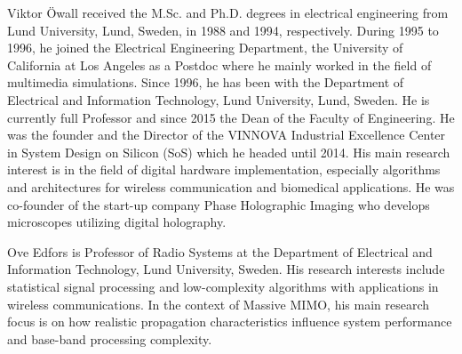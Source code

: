 \documentclass[journal]{IEEEtran}
\begin{document}
\begin{IEEEbiography}{Viktor \"{O}wall}
	received the M.Sc. and Ph.D. degrees in electrical engineering from Lund University, Lund, Sweden, in 1988 and 1994, respectively. 
	During 1995 to 1996, he joined the Electrical Engineering Department, the University of California at Los Angeles as a Postdoc where he mainly worked in the field of multimedia simulations. 
	Since 1996, he has been with the Department of Electrical and Information Technology, Lund University, Lund, Sweden. 
	He is currently full Professor and since 2015 the Dean of the Faculty of Engineering. 
	He was the founder and the Director of the VINNOVA Industrial Excellence Center in System Design on Silicon (SoS) which he headed until 2014. 
	His main research interest is in the field of digital hardware implementation, especially algorithms and architectures for wireless communication and biomedical applications. 
	He was co-founder of the start-up company Phase Holographic Imaging who develops microscopes utilizing digital holography.
\end{IEEEbiography}
%
\begin{IEEEbiography}{Ove Edfors}
	is Professor of Radio Systems at the Department of Electrical and Information Technology, Lund University, Sweden.
	His research interests include statistical signal processing and low-complexity algorithms with applications in wireless communications. 
	In the context of Massive MIMO, his main research focus is on how realistic propagation characteristics 
	influence system performance and base-band processing complexity.
\end{IEEEbiography}
%
%
%
%
%
%
%
%
%
%
%
%
%
%
%
%
%
%
%
%
%
%
%
%
%
%
%
%
%
%
%
%
%
%
%
%

%

%
%
%



%
\end{document}
